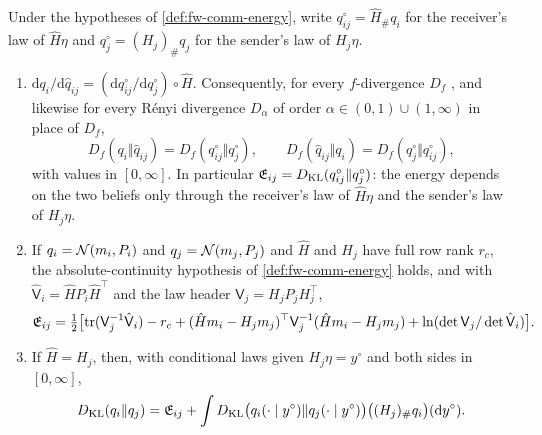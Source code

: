 \begin{lemma}\label{lem:fw-reception-identity}
Under the hypotheses of \cref{def:fw-comm-energy}, write $q^\circ_{ij}=\hat H_\#q_i$ for the receiver's law of $\hat H\eta$ and $q^\circ_j=(H_j)_\#q_j$ for the sender's law of $H_j\eta$.
\begin{enumerate}
\item[(a)] $\mathrm dq_i/\mathrm d\hat q_{ij}=(\mathrm dq^\circ_{ij}/\mathrm dq^\circ_j)\circ\hat H$. Consequently, for every $f$-divergence $D_f$ \citep{csiszar1967information}, and likewise for every R\'enyi divergence $D_\alpha$ of order $\alpha\in(0,1)\cup(1,\infty)$ \citep{renyi1961measures} in place of $D_f$,
\[
D_f(q_i\Vert\hat q_{ij})=D_f(q^\circ_{ij}\Vert q^\circ_j),\qquad D_f(\hat q_{ij}\Vert q_i)=D_f(q^\circ_j\Vert q^\circ_{ij}),
\]
with values in $[0,\infty]$. In particular $\mathfrak E_{ij}=D_{\mathrm{KL}}(q^\circ_{ij}\Vert q^\circ_j)$: the energy depends on the two beliefs only through the receiver's law of $\hat H\eta$ and the sender's law of $H_j\eta$.
\item[(b)] If $q_i=\mathcal{N}(m_i,P_i)$ and $q_j=\mathcal{N}(m_j,P_j)$ and $\hat H$ and $H_j$ have full row rank $r_c$, the absolute-continuity hypothesis of \cref{def:fw-comm-energy} holds, and with $\hat{\mathsf V}_i=\hat HP_i\hat H^\top$ and the law header $\mathsf V_j=H_jP_jH_j^\top$,
\[
\mathfrak E_{ij}=\tfrac12\bigl[\operatorname{tr}(\mathsf V_j^{-1}\hat{\mathsf V}_i)-r_c+(\hat Hm_i-H_jm_j)^\top\mathsf V_j^{-1}(\hat Hm_i-H_jm_j)+\ln(\det\mathsf V_j/\det\hat{\mathsf V}_i)\bigr].
\]
\item[(c)] If $\hat H=H_j$, then, with conditional laws given $H_j\eta=y^\circ$ and both sides in $[0,\infty]$,
\[
D_{\mathrm{KL}}(q_i\Vert q_j)=\mathfrak E_{ij}+\int D_{\mathrm{KL}}\bigl(q_i(\cdot\mid y^\circ)\Vert q_j(\cdot\mid y^\circ)\bigr)\bigl((H_j)_\#q_i\bigr)(\mathrm dy^\circ).
\]
\end{enumerate}
\end{lemma}


